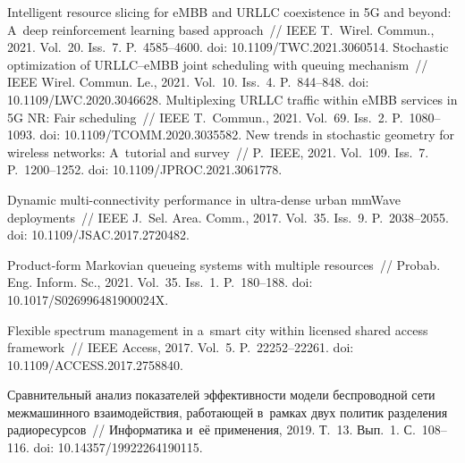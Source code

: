 \begin{multicols}{2}
{\small\frenchspacing
 {%
 \begin{thebibliography}{99}
 Intelligent 
resource slicing for eMBB and URLLC coexistence in 5G and beyond: A~deep reinforcement 
learning based approach~// IEEE T.~Wirel. Commun., 2021. Vol.~20. Iss.~7.  
P.~4585--4600. doi: 10.1109/TWC.2021.3060514.
 Stochastic optimization of URLLC--eMBB joint 
scheduling with queuing mechanism~// IEEE Wirel. Commun. Le., 2021. Vol.~10. 
Iss.~4. P.~844--848. doi: 10.1109/LWC.2020.3046628.
 Multiplexing URLLC traffic within eMBB services in 5G NR: Fair 
scheduling~// IEEE T.~Commun., 2021. Vol.~69. Iss.~2. P.~1080--1093. doi: 
10.1109/TCOMM.2020.3035582.
  New trends in 
stochastic geometry for wireless networks: A~tutorial and survey~// P.~IEEE, 2021. 
Vol.~109. Iss.~7. P.~1200--1252. doi: 10.1109/JPROC.2021.3061778.

 Dynamic  
multi-connectivity performance in ultra-dense urban mmWave deployments~// IEEE J.~Sel. 
Area. Comm., 2017. Vol.~35. Iss.~9. P.~2038--2055. doi: 10.1109/JSAC.2017.2720482.

 Product-form Markovian queueing systems with multiple 
resources~// Probab. Eng. Inform. Sc., 2021. Vol.~35. Iss.~1. P.~180--188. 
doi: 10.1017/S026996481900024X.

 Flexible spectrum management in a~smart city within licensed shared access 
framework~// IEEE Access, 2017. Vol.~5. P.~22252--22261. doi: 10.1109/ACCESS.2017.2758840.

Сравнительный анализ показателей эффективности модели беспроводной сети 
межмашинного взаимодействия, работающей в~рамках двух политик разделения 
радиоресурсов~// Информатика и~её применения, 2019. Т.~13. Вып.~1. С.~108--116. doi: 
10.14357/19922264190115.


\end{thebibliography}}}
\end{multicols}
